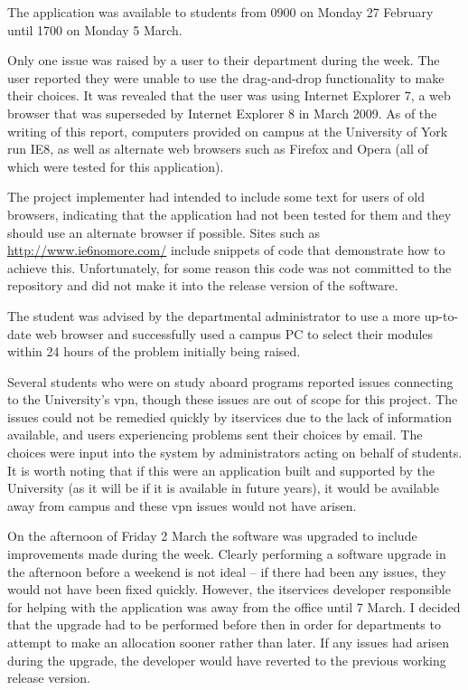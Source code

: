 The application was available to students from 0900 on Monday 27 February
until 1700 on Monday 5 March. %




Only one issue was raised by a user to their department during the week. The
user reported they were unable to use the drag-and-drop functionality to make
their choices. It was revealed that the user was using Internet Explorer 7, a
web browser that was superseded by Internet Explorer 8 in March 2009. As of
the writing of this report, computers provided on campus at the University of
York run IE8, as well as alternate web browsers such as Firefox and Opera (all
of which were tested for this application).

The project implementer had intended to include some text for users of old
browsers, indicating that the application had not been tested for them and
they should use an alternate browser if possible. Sites such as
\url{http://www.ie6nomore.com/} include snippets of code that demonstrate how
to achieve this. Unfortunately, for some reason this code was not committed to
the repository and did not make it into the release version of the software.

The student was advised by the departmental administrator to use a more
up-to-date web browser and successfully used a campus PC to select their
modules within 24 hours of the problem initially being raised.

Several students who were on study aboard programs reported issues connecting
to the University's \gls{vpn}, though these issues are out of scope for this
project. The issues could not be remedied quickly by \gls{itservices} due to
the lack of information available, and users experiencing problems sent their
choices by email. The choices were input into the system by administrators
acting on behalf of students. It is worth noting that if this were an
application built and supported by the University (as it will be if it is
available in future years), it would be available away from campus and these
\gls{vpn} issues would not have arisen.

On the afternoon of Friday 2 March the software was upgraded to include
improvements made during the week. Clearly performing a software upgrade in
the afternoon before a weekend is not ideal -- if there had been any issues,
they would not have been fixed quickly. However, the \gls{itservices}
developer responsible for helping with the application was away from the
office until 7 March. I decided that the upgrade had to be performed before
then in order for departments to attempt to make an allocation sooner rather
than later. If any issues had arisen during the upgrade, the developer would
have reverted to the previous working release version.

